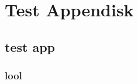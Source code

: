 
\thispagestyle{fancy}
\chapter{Test Appendisk}
\label{app:test_appendiks}

\lipsum

\section{test app}

\lipsum

\subsection{lool}

\lipsum